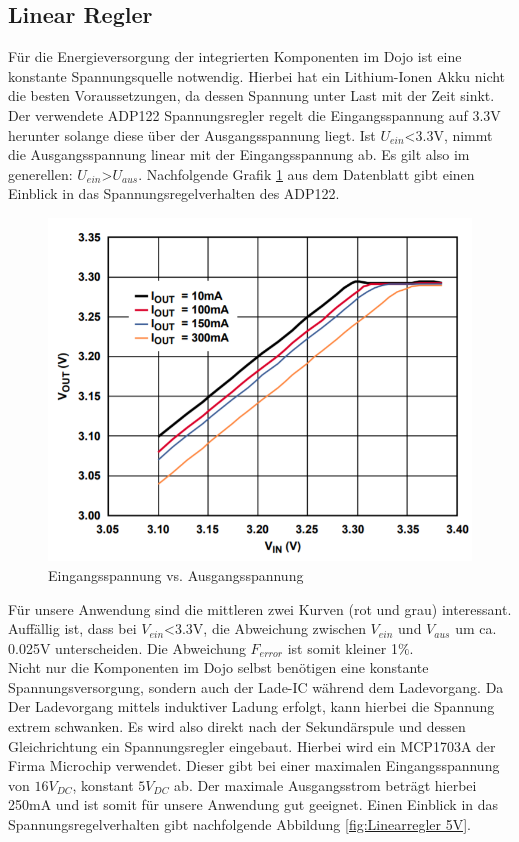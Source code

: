 \subsection{Linear Regler} \label{sec:linearregler}
Für die Energieversorgung der integrierten Komponenten im Dojo ist eine konstante Spannungsquelle notwendig. Hierbei hat ein Lithium-Ionen Akku nicht die besten Voraussetzungen, da dessen Spannung unter Last mit der Zeit sinkt. Der verwendete ADP122 Spannungsregler regelt die Eingangsspannung auf 3.3V herunter solange diese über der Ausgangsspannung liegt. Ist $U_{ein}$<3.3V, nimmt die Ausgangsspannung linear mit der Eingangsspannung ab. Es gilt also im generellen: $U_{ein}$>$U_{aus}$. Nachfolgende Grafik \ref{fig:Linearregler 3.3V} aus dem Datenblatt gibt einen Einblick in das Spannungsregelverhalten des ADP122.

\begin{figure}[H]
	\begin{center}
		\includegraphics[width=120mm]{data/Linearregler_3_3V.png}
		\caption[ADP 122 Linearregler Spannungsverhalten]{Eingangsspannung vs. Ausgangsspannung \cite{ADP122LinearRegulator}} %
		\label{fig:Linearregler 3.3V}
	\end{center}
\end{figure} 

Für unsere Anwendung sind die mittleren zwei Kurven (rot und grau) interessant. Auffällig ist, dass bei $V_{ein}$<3.3V, die Abweichung zwischen $V_{ein}$ und $V_{aus}$ um ca. 0.025V unterscheiden. Die Abweichung $F_{error}$ ist somit kleiner 1$\%$.
\\
Nicht nur die Komponenten im Dojo selbst benötigen eine konstante Spannungsversorgung, sondern auch der Lade-IC während dem Ladevorgang. Da Der Ladevorgang mittels induktiver Ladung erfolgt, kann hierbei die Spannung extrem schwanken. Es wird also direkt nach der Sekundärspule und dessen Gleichrichtung ein Spannungsregler eingebaut. Hierbei wird ein MCP1703A der Firma Microchip verwendet. Dieser gibt bei einer maximalen Eingangsspannung von $16V_{DC}$, konstant $5V_{DC}$ ab. Der maximale Ausgangsstrom beträgt hierbei 250mA und ist somit für unsere Anwendung gut geeignet. Einen Einblick in das Spannungsregelverhalten gibt nachfolgende Abbildung \ref{fig:Linearregler 5V}.

